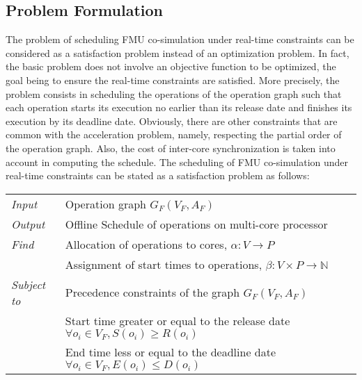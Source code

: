 \subsection{Problem Formulation}

The problem of scheduling FMU co-simulation under real-time constraints can be considered as a satisfaction problem instead of an optimization problem. In fact, the basic problem does not involve an objective function to be optimized, the goal being to ensure the real-time constraints are satisfied. More precisely, the problem consists in scheduling the operations of the operation graph such that each operation starts its execution no earlier than its release date and finishes its execution by its deadline date. Obviously, there are other constraints that are common with the acceleration problem, namely, respecting the partial order of the operation graph. Also, the cost of inter-core synchronization is taken into account in computing the schedule. The scheduling of FMU co-simulation under real-time constraints can be stated as a satisfaction problem as follows:

\begin{table}[h]
\centering
\begin{tabular}{l  l}
  \rule{0pt}{5ex}	
	\textit{Input} & Operation graph $G_F(V_F,A_F)$\\
	\rule{0pt}{5ex}									  
	
  \textit{Output} & Offline Schedule of operations on multi-core processor\\
	\rule{0pt}{5ex}									  
  
	\textit{Find} & Allocation of operations to cores, $\alpha: V \rightarrow P$\\
	\rule{0pt}{5ex}
                & Assignment of start times to operations, $\beta: V \times P \rightarrow \mathbb{N}$\\
	\rule{0pt}{5ex}								 
	
	\textit{Subject to} & Precedence constraints of the graph $G_F(V_F,A_F)$\\
											& Start time greater or equal to the release date $\forall o_i \in V_F, S(o_i) \geq R(o_i)$\\
											& End time less or equal to the deadline date $\forall o_i \in V_F, E(o_i) \leq D(o_i)$\\
										 
	
\end{tabular}
\end{table}

